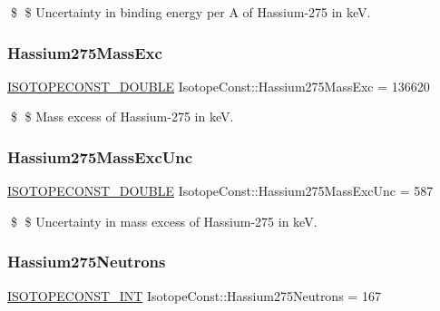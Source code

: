 \$ \$ Uncertainty in binding energy per A of Hassium-\/275 in keV. \mbox{\label{group___isotope_const-_hassium-_hs275_gabbdfffe6c1cd45d2ad80517186e3071f}} 
\subsubsection{\texorpdfstring{Hassium275\+Mass\+Exc}{Hassium275MassExc}}
{\footnotesize\ttfamily \mbox{\hyperlink{group___isotope_const-_macros_ga8f45a7272ce02c0b4c65c44636ed719a}{I\+S\+O\+T\+O\+P\+E\+C\+O\+N\+S\+T\+\_\+\+D\+O\+U\+B\+LE}} Isotope\+Const\+::\+Hassium275\+Mass\+Exc = 136620}

\$ \$ Mass excess of Hassium-\/275 in keV. \mbox{\label{group___isotope_const-_hassium-_hs275_gaa20ba343ca1c9f21b0491b00baf8247f}} 
\subsubsection{\texorpdfstring{Hassium275\+Mass\+Exc\+Unc}{Hassium275MassExcUnc}}
{\footnotesize\ttfamily \mbox{\hyperlink{group___isotope_const-_macros_ga8f45a7272ce02c0b4c65c44636ed719a}{I\+S\+O\+T\+O\+P\+E\+C\+O\+N\+S\+T\+\_\+\+D\+O\+U\+B\+LE}} Isotope\+Const\+::\+Hassium275\+Mass\+Exc\+Unc = 587}

\$ \$ Uncertainty in mass excess of Hassium-\/275 in keV. \mbox{\label{group___isotope_const-_hassium-_hs275_gad204d562904e13c94e352ca5254d54e9}} 
\subsubsection{\texorpdfstring{Hassium275\+Neutrons}{Hassium275Neutrons}}
{\footnotesize\ttfamily \mbox{\hyperlink{group___isotope_const-_macros_ga5f18360b3e99483a35c32d789e62621c}{I\+S\+O\+T\+O\+P\+E\+C\+O\+N\+S\+T\+\_\+\+I\+NT}} Isotope\+Const\+::\+Hassium275\+Neutrons = 167}

